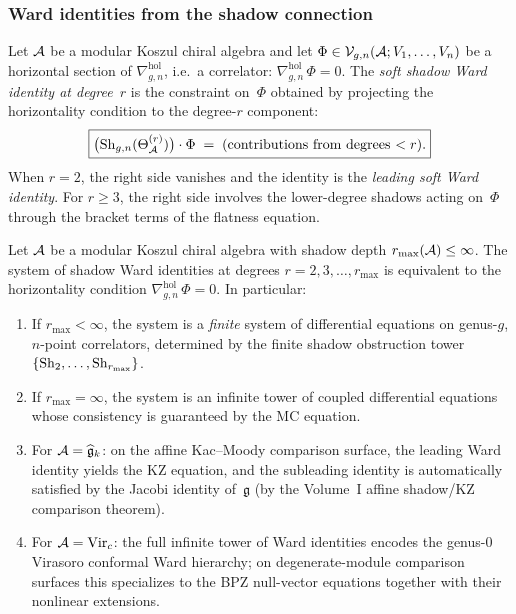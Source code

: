 \subsubsection{Ward identities from the shadow connection}

\begin{definition}
Let $\mathcal{A}$ be a modular Koszul chiral algebra and let
$\Phi \in \mathcal{V}_{g,n}(\mathcal{A}; V_1, \dotsc, V_n)$ be a horizontal
section of $\nabla^{\mathrm{hol}}_{g,n}$, i.e.\ a correlator:
$\nabla^{\mathrm{hol}}_{g,n}\,\Phi = 0$.
The \emph{soft shadow Ward identity at degree~$r$} is the
constraint on~$\Phi$ obtained by projecting the horizontality
condition to the degree-$r$ component:
\begin{equation}%
\boxed{%
\bigl(\Sh_{g,n}(\Theta^{(r)}_\cA)\bigr) \cdot \Phi
\;=\;
\text{(contributions from degrees $< r$)}.}
\end{equation}
When $r = 2$, the right side vanishes and the identity is the
\emph{leading soft Ward identity}. For $r \geq 3$, the right side
involves the lower-degree shadows acting on~$\Phi$ through the
bracket terms of the flatness equation.
\end{definition}

\begin{theorem}
\label{thm:thqg-VI-ward-determines-correlators}
Let $\mathcal{A}$ be a modular Koszul chiral algebra with shadow depth
$r_{\max}(\mathcal{A}) \leq \infty$. The system of shadow Ward identities
at degrees $r = 2, 3, \dotsc, r_{\max}$ is equivalent to the
horizontality condition $\nabla^{\mathrm{hol}}_{g,n}\,\Phi = 0$.
In particular:
\begin{enumerate}[label=\textup{(\roman*)}]
\item If $r_{\max} < \infty$, the system is a \emph{finite}
 system of differential equations on genus-$g$, $n$-point
 correlators, determined by the finite shadow obstruction tower
 $\{\operatorname{Sh}_2, \dotsc, \operatorname{Sh}_{r_{\max}}\}$.
\item If $r_{\max} = \infty$, the system is an infinite tower
 of coupled differential equations whose consistency is
 guaranteed by the MC equation.
\item For $\mathcal{A} = \widehat{\mathfrak{g}}_k$:
 on the affine Kac--Moody comparison surface, the leading Ward
 identity yields the KZ equation, and the
 subleading identity is automatically satisfied by the Jacobi
 identity of~$\mathfrak{g}$
 (by the Volume~I affine shadow/KZ comparison theorem).
\item For $\mathcal{A} = \mathrm{Vir}_c$: the full infinite tower of
 Ward identities encodes the genus-$0$ Virasoro conformal Ward
 hierarchy; on degenerate-module comparison surfaces this
 specializes to the BPZ null-vector equations together with
 their nonlinear extensions.
\end{enumerate}
\end{theorem}

